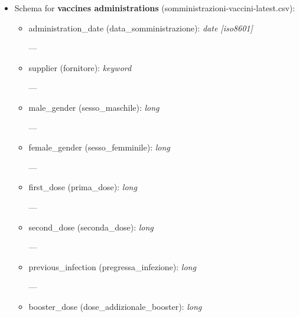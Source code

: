 \documentclass[12pt, a4paper]{article}
\begin{document}
\begin{itemize}
    \item Schema for \textbf{vaccines administrations} 
        (somministrazioni-vaccini-latest.csv):
        \begin{itemize}
            \item administration\_date (data\_somministrazione): \emph{date [iso8601]} \\
                \begin{footnotesize}
                    ---
                \end{footnotesize}
            \item supplier (fornitore): \emph{keyword} \\
                \begin{footnotesize}
                    ---
                \end{footnotesize}
            \item male\_gender (sesso\_maschile): \emph{long} \\
                \begin{footnotesize}
                    ---
                \end{footnotesize}
            \item female\_gender (sesso\_femminile): \emph{long} \\
                \begin{footnotesize}
                    ---
                \end{footnotesize}
            \item first\_dose (prima\_dose): \emph{long} \\
                \begin{footnotesize}
                    ---
                \end{footnotesize}
            \item second\_dose (seconda\_dose): \emph{long} \\
                \begin{footnotesize}
                    ---
                \end{footnotesize}
            \item previous\_infection (pregressa\_infezione): \emph{long} \\
                \begin{footnotesize}
                    ---
                \end{footnotesize}
            \item booster\_dose (dose\_addizionale\_booster): \emph{long} \\

\end{itemize}
\end{itemize}
\end{document}
